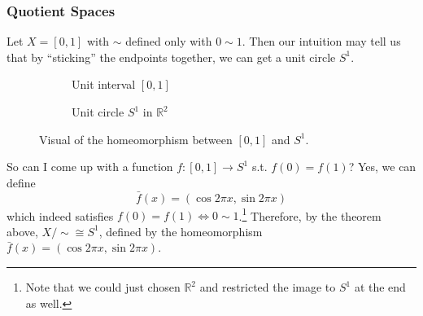   \subsubsection{Quotient Spaces}

    \begin{example}[1-Sphere]
      Let $X = [0, 1]$ with $\sim$ defined only with $0 \sim 1$. Then our intuition may tell us that by ``sticking'' the endpoints together, we can get a unit circle $S^1$. 

      \begin{figure}[H]
        \centering
        \begin{subfigure}[b]{0.48\textwidth}
          \centering
          \caption{Unit interval $[0, 1]$}
          \label{fig:unit-interval}
        \end{subfigure}
        \hfill 
        \begin{subfigure}[b]{0.48\textwidth}
          \centering
          \caption{Unit circle $S^1$ in $\mathbb{R}^2$}
          \label{fig:unit-circle}
        \end{subfigure}
        \caption{Visual of the homeomorphism between $[0, 1]$ and $S^1$.}
        \label{fig:comparison}
      \end{figure}

      So can I come up with a function $f: [0, 1] \rightarrow S^1$ s.t. $f(0) = f(1)$? Yes, we can define 
      \begin{equation}
        \bar{f}(x) = (\cos{2 \pi x}, \sin{2\pi x})
      \end{equation} 
      which indeed satisfies $f(0) = f(1) \iff 0 \sim 1$.\footnote{Note that we could just chosen $\mathbb{R}^2$ and restricted the image to $S^1$ at the end as well.} Therefore, by the theorem above, $X/{\sim} \cong S^1$, defined by the homeomorphism $\bar{f}(x) = (\cos{2 \pi x}, \sin{2\pi x})$.  
    \end{example}

